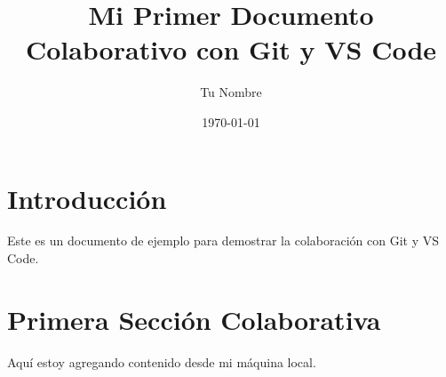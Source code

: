 \documentclass{article}
\title{Mi Primer Documento Colaborativo con Git y VS Code}
\author{Tu Nombre}
\date{\today}
\begin{document}
\maketitle

\section{Introducción}
Este es un documento de ejemplo para demostrar la colaboración con Git y VS Code.

\section{Primera Sección Colaborativa}
Aquí estoy agregando contenido desde mi máquina local.
\end{document}
